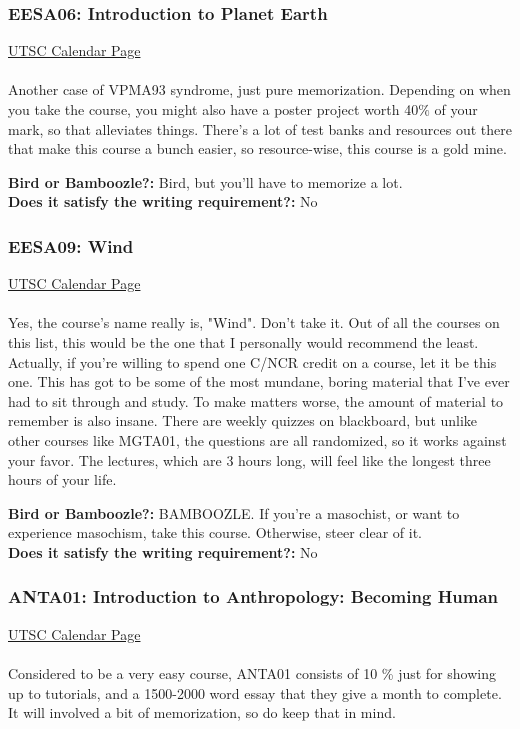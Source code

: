 \documentclass[11pt]{article}
\begin{document}
\subsubsection{EESA06: Introduction to Planet Earth}
\href{https://utsc.calendar.utoronto.ca/course/EESA06H3}{UTSC Calendar Page}\\\\
Another case of VPMA93 syndrome, just pure memorization. Depending on
when you take the course, you might also have a poster project worth
40$\%$ of your mark, so that alleviates things. There's a lot of test
banks and resources out there that make this course a bunch easier, so
resource-wise, this course is a gold mine.

\textbf{Bird or Bamboozle?:} Bird, but you'll have to memorize a lot.\\

\textbf{Does it satisfy the writing requirement?:} No

\subsubsection{EESA09: Wind}
\href{https://utsc.calendar.utoronto.ca/course/EESA09H3}{UTSC Calendar Page}\\\\
Yes, the course's name really is, "Wind". Don't take it. Out of all the
courses on this list, this would be the one that I personally would
recommend the least. Actually, if you're willing to spend one C/NCR
credit on a course, let it be this one. This has got to be some of the
most mundane, boring material that I've ever had to sit through and
study. To make matters worse, the amount of material to remember is also
insane. There are weekly quizzes on blackboard, but unlike other courses
like MGTA01, the questions are all randomized, so it works against your
favor. The lectures, which are 3 hours long, will feel like the longest
three hours of your life.

\textbf{Bird or Bamboozle?:}
BAMBOOZLE. If you're a masochist, or want to experience masochism, take
this course. Otherwise, steer clear of it.\\

\textbf{Does it satisfy the writing requirement?:} No

\subsubsection{ANTA01: Introduction to Anthropology: Becoming Human}
\href{https://utsc.calendar.utoronto.ca/course/ANTA01H3}{UTSC Calendar Page}\\\\
Considered to be a very easy course, ANTA01 consists of 10 \% just for
showing up to tutorials, and a 1500-2000 word essay that they give a
month to complete. It will involved a bit of memorization, so do keep
that in mind.\\
\end{document}
